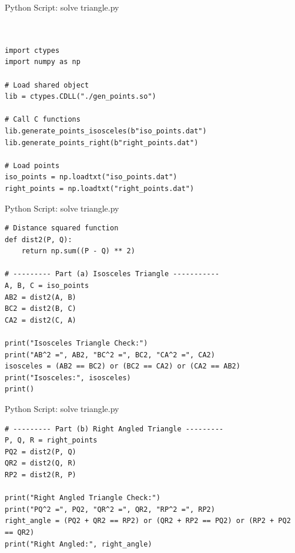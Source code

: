 \documentclass{beamer}
\numberwithin{equation}{section}
\theoremstyle{remark}
\begin{document}
\begin{frame}[fragile]{Python Script: solve triangle.py}
\begin{verbatim}


import ctypes
import numpy as np

# Load shared object
lib = ctypes.CDLL("./gen_points.so")

# Call C functions
lib.generate_points_isosceles(b"iso_points.dat")
lib.generate_points_right(b"right_points.dat")

# Load points
iso_points = np.loadtxt("iso_points.dat")
right_points = np.loadtxt("right_points.dat")
\end{verbatim}
\end{frame}
\begin{frame}[fragile]{Python Script: solve triangle.py}
\begin{verbatim}
# Distance squared function
def dist2(P, Q):
    return np.sum((P - Q) ** 2)

# --------- Part (a) Isosceles Triangle -----------
A, B, C = iso_points
AB2 = dist2(A, B)
BC2 = dist2(B, C)
CA2 = dist2(C, A)

print("Isosceles Triangle Check:")
print("AB^2 =", AB2, "BC^2 =", BC2, "CA^2 =", CA2)
isosceles = (AB2 == BC2) or (BC2 == CA2) or (CA2 == AB2)
print("Isosceles:", isosceles)
print()
\end{verbatim}
\end{frame}
\begin{frame}[fragile]{Python Script: solve triangle.py}
\begin{verbatim}
# --------- Part (b) Right Angled Triangle ---------
P, Q, R = right_points
PQ2 = dist2(P, Q)
QR2 = dist2(Q, R)
RP2 = dist2(R, P)

print("Right Angled Triangle Check:")
print("PQ^2 =", PQ2, "QR^2 =", QR2, "RP^2 =", RP2)
right_angle = (PQ2 + QR2 == RP2) or (QR2 + RP2 == PQ2) or (RP2 + PQ2 == QR2)
print("Right Angled:", right_angle)

\end{verbatim}
\end{frame}
\end{document}
